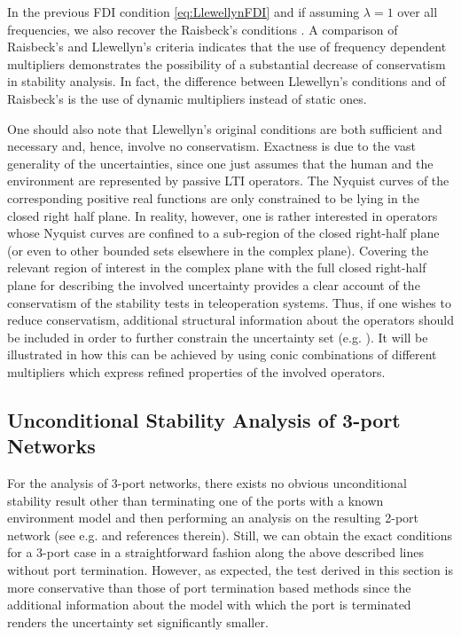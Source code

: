 \begin{rem} In the previous FDI condition \eqref{eq:LlewellynFDI} and if assuming 
$\lambda = 1$ over all frequencies, we also recover the Raisbeck's conditions 
\cite{raisbeck}. A comparison of Raisbeck's and Llewellyn's criteria indicates that 
the use of frequency dependent multipliers demonstrates the possibility of a substantial 
decrease of conservatism in stability analysis. In fact, the difference between Llewellyn's 
conditions and of Raisbeck's is the use of dynamic multipliers instead of static ones.
\end{rem}
\begin{rem} One should also note that Llewellyn's original conditions are both sufficient
and necessary and, hence, involve no conservatism. Exactness is due to the vast generality 
of the uncertainties, since one just assumes that the human and the environment are  
represented by passive LTI operators. The Nyquist curves of the corresponding positive 
real functions are only constrained {to be} lying in the closed right half plane. In 
reality, however, one is rather interested in operators whose Nyquist curves are confined 
to a sub-region of the closed right-half plane (or even to other bounded sets elsewhere 
in the complex plane). Covering the relevant region of interest in the complex plane 
with the full closed right-half plane for describing the involved uncertainty provides a 
clear account of the conservatism of the stability tests in teleoperation systems. Thus, 
if one wishes to reduce conservatism, additional structural information about the operators 
should be included {in order} to further constrain the uncertainty set (e.g. \cite{chopark,
hzaadsalcu,haddadizaad,willaertIJRR10}). It will be illustrated in  how this 
can be achieved by using conic combinations of different multipliers which express refined 
properties of the involved operators.
\end{rem}

\subsection{Unconditional Stability Analysis of 3-port Networks}\label{sec:threeport}
For the analysis of 3-port networks, there exists no obvious unconditional stability 
result other than terminating one of the ports with a known environment model 
and then performing an analysis on the resulting 2-port network (see e.g. \cite{khademian} 
and references therein). Still, we can obtain the exact conditions for a 3-port case in a 
straightforward fashion along the above described lines without port termination. 
However, as expected, the test derived in this section is more conservative
than those of port termination based methods since the additional information about
the model with which the port is terminated renders the uncertainty set
significantly smaller.


